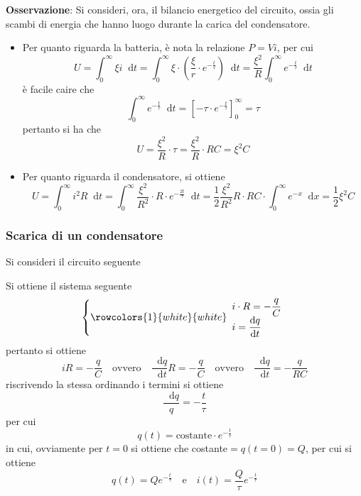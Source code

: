 \documentclass[a4paper]{extarticle}
\newcommand\dif{\mathop{}\!\mathrm{d}}
\begin{document}
\vspace{1em}
\noindent
\textbf{Osservazione}: Si consideri, ora, il bilancio energetico del circuito, ossia gli scambi di energia che hanno luogo durante la carica del condensatore.\\
\begin{itemize}
  \item Per quanto riguarda la batteria, è nota la relazione $P=Vi$, per cui
  \[U = \int_0^\infty \xi i \dif t = \int_0^\infty \xi \cdot \left(\dfrac{\xi}{r} \cdot e^{-\frac{t}{\tau}} \right) \dif t = \dfrac{\xi^2}{R} \int_0^\infty e^{-\frac{t}{\tau}} \dif t\]
  è facile caire che
  \[\int_0^\infty e^{-\frac{t}{\tau}} \dif t = \left[- \tau \cdot e^{-\frac{t}{\tau}}\right]_0^{\infty} = \tau\]
  pertanto si ha che
  \[U=\frac{\xi^2}{R} \cdot \tau = \frac{\xi^2}{R} \cdot RC = \xi^2 C\]

  \item Per quanto riguarda il condensatore, si ottiene
  \[U = \int_0^\infty i^2 R \dif t = \int_0^\infty \frac{\xi^2}{R^2} \cdot R \cdot e^{-\frac{2t}{\tau}} \dif t = \frac{1}{2} \frac{\xi^2}{R^2} R \cdot RC \cdot \int_0^\infty e^{-x} \dif x = \frac{1}{2} \xi^2 C\]
\end{itemize}

\vspace{1em}
\noindent
\subsubsection{Scarica di un condensatore}
Si consideri il circuito seguente

Si ottiene il sistema seguente
\[\left\{
  \rowcolors{1}{white}{white}
  \begin{array}{l}
    i \cdot R = - \dfrac{q}{C}\\
    i=\dfrac{\dif q}{\dif t}\\
\end{array}\right.\]
pertanto si ottiene
\[i R = - \frac{q}{C} \hspace{1em} \text{ovvero} \hspace{1em} \frac{\dif q}{\dif t} R = - \frac{q}{C} \hspace{1em} \text{ovvero} \hspace{1em} \dfrac{\dif q}{\dif t} = - \frac{q}{RC}\]
riscrivendo la stessa ordinando i termini si ottiene
\[\frac{\dif q}{q} = - \frac{t}{\tau}\]
per cui
\[q(t) = \text{costante} \cdot e^{-\frac{t}{\tau}}\]
in cui, ovviamente per $t=0$ si ottiene che costante$=q(t=0)=Q$, per cui si ottiene
\[q(t) = Q e^{-\frac{t}{\tau}} \hspace{1em} \text{e} \hspace{1em} i(t) = \frac{Q}{\tau} e^{-\frac{t}{\tau}}\]
\end{document}
